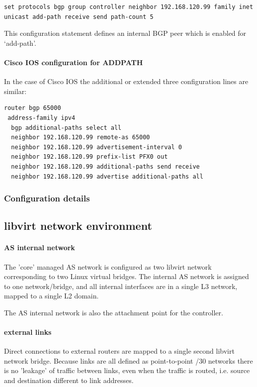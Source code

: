 \begin{verbatim}
set protocols bgp group controller neighbor 192.168.120.99 family inet unicast add-path receive send path-count 5
\end{verbatim}
This configuration statement defines an internal BGP peer which is enabled for `add-path'.

\paragraph{Cisco IOS configuration for ADDPATH}

In the case of Cisco IOS the additional or extended three configuration lines are similar:
\begin{verbatim}
router bgp 65000
 address-family ipv4
  bgp additional-paths select all
  neighbor 192.168.120.99 remote-as 65000
  neighbor 192.168.120.99 advertisement-interval 0
  neighbor 192.168.120.99 prefix-list PFX0 out
  neighbor 192.168.120.99 additional-paths send receive
  neighbor 192.168.120.99 advertise additional-paths all
\end{verbatim}

\subsubsection{Configuration details}


\subsection{libvirt network environment}

\paragraph{AS internal network}
The 'core' managed AS network is configured as two libvirt network corresponding to two Linux virtual bridges.
The internal AS network is assigned to one network/bridge, and all internal interfaces are in a single L3 network, mapped to a single L2 domain.

The AS internal network is also the attachment point for the \hbgp controller.

\paragraph{external links}
Direct connections to external routers are mapped to a single second libvirt network bridge.  Because links are all defined as point-to-point /30 networks there is no 'leakage' of traffic between links, even when the traffic is routed, i.e. source and destination different to link addresses.


